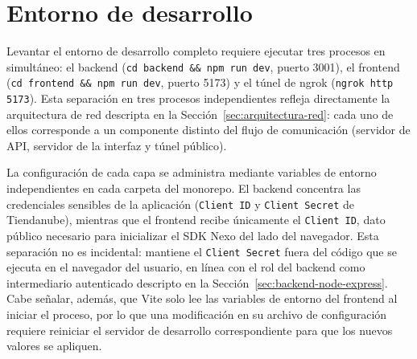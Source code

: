 \section{Entorno de desarrollo}

Levantar el entorno de desarrollo completo requiere ejecutar tres procesos en simultáneo: el backend (\texttt{cd backend \&\& npm run dev}, puerto 3001), el frontend (\texttt{cd frontend \&\& npm run dev}, puerto 5173) y el túnel de ngrok (\texttt{ngrok http 5173}). Esta separación en tres procesos independientes refleja directamente la arquitectura de red descripta en la Sección~\ref{sec:arquitectura-red}: cada uno de ellos corresponde a un componente distinto del flujo de comunicación (servidor de API, servidor de la interfaz y túnel público).

La configuración de cada capa se administra mediante variables de entorno independientes en cada carpeta del monorepo. El backend concentra las credenciales sensibles de la aplicación (\texttt{Client ID} y \texttt{Client Secret} de Tiendanube), mientras que el frontend recibe únicamente el \texttt{Client ID}, dato público necesario para inicializar el SDK Nexo del lado del navegador. Esta separación no es incidental: mantiene el \texttt{Client Secret} fuera del código que se ejecuta en el navegador del usuario, en línea con el rol del backend como intermediario autenticado descripto en la Sección~\ref{sec:backend-node-express}. Cabe señalar, además, que Vite solo lee las variables de entorno del frontend al iniciar el proceso, por lo que una modificación en su archivo de configuración requiere reiniciar el servidor de desarrollo correspondiente para que los nuevos valores se apliquen.
